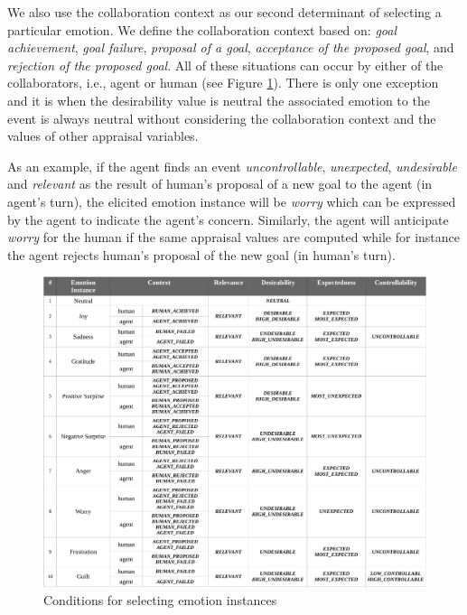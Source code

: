 \documentclass[12pt]{report}
\begin{document}
We also use the collaboration context as our second determinant of selecting a
particular emotion. We define the collaboration context based on: \textit{goal
achievement}, \textit{goal failure}, \textit{proposal of a goal},
\textit{acceptance of the proposed goal}, and \textit{rejection of the proposed
goal}. All of these situations can occur by either of the collaborators, i.e.,
agent or human (see Figure \ref{fig:emotion_elicitation}). There is only one
exception and it is when the desirability value is neutral the associated
emotion to the event is always neutral without considering the collaboration
context and the values of other appraisal variables.

As an example, if the agent finds an event \textit{uncontrollable},
\textit{unexpected}, \textit{undesirable} and \textit{relevant} as the result of
human's proposal of a new goal to the agent (in agent's turn), the elicited
emotion instance will be \textit{worry} which can be expressed by the agent to
indicate the agent's concern. Similarly, the agent will anticipate
\textit{worry} for the human if the same appraisal values are computed while for
instance the agent rejects human's proposal of the new goal (in human's turn).


\begin{figure}
  \centering
  \includegraphics[width=1\textwidth]{figure/emotion_elicitation_croped.pdf}
  \caption{Conditions for selecting emotion instances}
  \label{fig:emotion_elicitation}
\end{figure}
\end{document}
